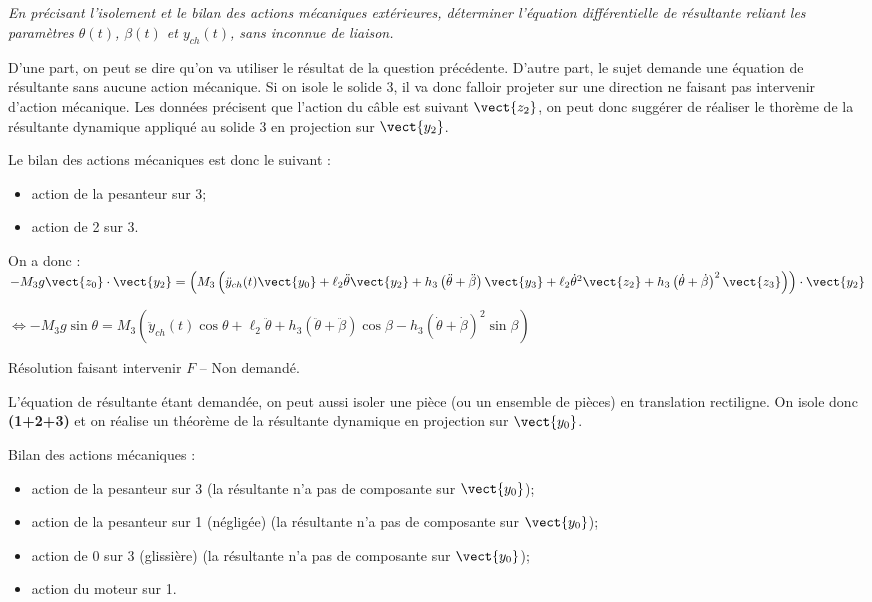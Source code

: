 \documentclass[10pt,fleqn]{article} %
\begin{document}
\subparagraph{}
\textit{En précisant l’isolement et le bilan des actions mécaniques extérieures, déterminer l’équation différentielle
de résultante reliant les paramètres $\theta(t)$, $\beta(t)$%
 et $y_{ch}(t)$, sans inconnue de liaison.}
\ifprof
\begin{corrige}

D'une part, on peut se dire qu'on va utiliser le résultat de la question précédente. D'autre part, le sujet demande une équation de résultante sans aucune action mécanique. Si on isole le solide 3, il va donc falloir projeter sur une direction ne faisant pas intervenir d'action mécanique. Les données précisent que l'action du câble est suivant $\vect{z_2}$, on peut donc suggérer de réaliser le thorème de la résultante dynamique appliqué au solide 3 en projection sur $\vect{y_2}$. 

Le bilan des actions mécaniques est donc le suivant : 
\begin{itemize}
\item action de la pesanteur sur 3;
\item action de 2 sur 3.
\end{itemize}

On a donc :
$-M_3 g \vect{z_0}\cdot \vect{y_2} = 
\left( M_3\left(\ddot{y}_{ch}(t) \vect{y_0}+\ell_2\ddot{\theta} \vect{y_2}+h_3\left(\ddot{\theta}+\ddot{\beta}\right) \vect{y_3}
+   
\ell_2\dot{\theta}^2 \vect{z_2}  +h_3\left(\dot{\theta}+\dot{\beta}\right)^2\vect{z_3}\right)\right) \cdot \vect{y_2}$

$ \Leftrightarrow -M_3 g \sin \theta  = 
 M_3\left(\ddot{y}_{ch}(t) \cos \theta +\ell_2\ddot{\theta} +h_3\left(\ddot{\theta}+\ddot{\beta}\right)\cos \beta 
-h_3\left(\dot{\theta}+\dot{\beta}\right)^2\sin\beta \right)$


\vspace{.6cm}
Résolution faisant intervenir $F$ -- Non demandé.

L'équation de résultante étant demandée, on peut aussi isoler une pièce (ou un ensemble de pièces) en translation rectiligne. On isole donc \textbf{(1+2+3)} et on réalise un théorème de la résultante dynamique en projection sur $\vect{y_0}$. 

Bilan des actions mécaniques : 
\begin{itemize}
\item action de la pesanteur sur 3 (la résultante n'a pas de composante sur $\vect{y_0}$);
\item action de la pesanteur sur 1 (négligée) (la résultante n'a pas de composante sur $\vect{y_0}$);
\item action de 0 sur 3 (glissière) (la résultante n'a pas de composante sur $\vect{y_0}$);
\item action du moteur sur 1.
\end{itemize}


\end{corrige}
\end{document}
